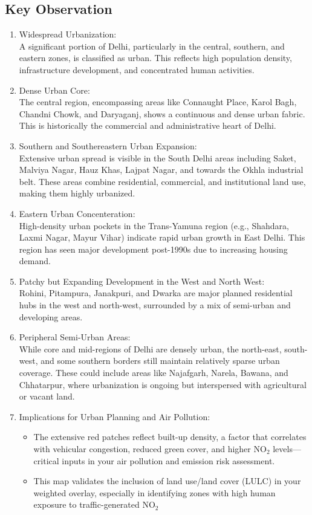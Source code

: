 \documentclass[12pt]{report}
\begin{document}
\subsection{Key Observation}
\begin{enumerate}
    \item Widespread Urbanization:\\
    A significant portion of Delhi, particularly in the central, southern, and eastern zones, is classified as urban. This reflects high population density, infrastructure development, and concentrated human activities.
    \item Dense Urban Core:\\
    The central region, encompassing areas like Connaught Place, Karol Bagh, Chandni Chowk, and Daryaganj, shows a continuous and dense urban fabric. This is historically the commercial and administrative heart of Delhi.
    \item Southern and Southereastern Urban Expansion:\\
    Extensive urban spread is visible in the South Delhi areas including Saket, Malviya Nagar, Hauz Khas, Lajpat Nagar, and towards the Okhla industrial belt. These areas combine residential, commercial, and institutional land use, making them highly urbanized.
    \item Eastern Urban Concenteration:\\
    High-density urban pockets in the Trans-Yamuna region (e.g., Shahdara, Laxmi Nagar, Mayur Vihar) indicate rapid urban growth in East Delhi. This region has seen major development post-1990s due to increasing housing demand.
    \item Patchy but Expanding Development in the West and North West:\\
    Rohini, Pitampura, Janakpuri, and Dwarka are major planned residential hubs in the west and north-west, surrounded by a mix of semi-urban and developing areas.
    \item Peripheral Semi-Urban Areas:\\
    While core and mid-regions of Delhi are densely urban, the north-east, south-west, and some southern borders still maintain relatively sparse urban coverage. These could include areas like Najafgarh, Narela, Bawana, and Chhatarpur, where urbanization is ongoing but interspersed with agricultural or vacant land.
    \item Implications for Urban Planning and Air Pollution:\\
    \begin{itemize}
        \item The extensive red patches reflect built-up density, a factor that correlates with vehicular congestion, reduced green cover, and higher NO$_2$ levels—critical inputs in your air pollution and emission risk assessment.
        \item This map validates the inclusion of land use/land cover (LULC) in your weighted overlay, especially in identifying zones with high human exposure to traffic-generated NO$_2$
    \end{itemize}
\end{enumerate}
\end{document}
